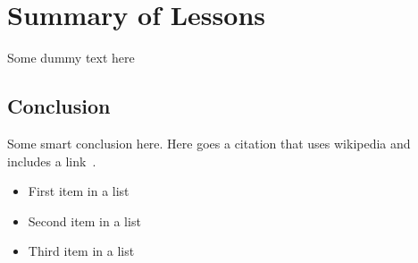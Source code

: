 \section{Summary of Lessons}

Some dummy text here
\subsection{Conclusion}

Some smart conclusion here.
Here goes a citation that uses wikipedia and includes a link~\cite{busFactor}.

\begin{itemize}[noitemsep] %
    \item First item in a list
    \item Second item in a list
    \item Third item in a list
\end{itemize}
